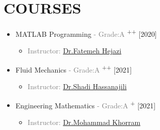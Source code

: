 \documentclass[10pt,a4paper,sans]{moderncv} %
\begin{document}
  
  
	



         
    \section{COURSES}
	\vspace{-1.1 em} 
	
	\begin{multicols}{2}
		\begin{itemize}
			\item {} MATLAB Programming \textcolor{gray}{- Grade:A }\textsuperscript{++} \hfill[2020]
			\begin{itemize}
				\item \textcolor{gray}{Instructor: \href{https://scholar.google.com/citations?hl=en&user=SJs5rMcAAAAJ}{Dr.Fatemeh Hejazi}}


			\end{itemize}
			
			\vspace{0.5 em} 
			\item {} Fluid Mechanics  \textcolor{gray}{- Grade:A }\textsuperscript{++} \hfill[2021]
			\begin{itemize}
				\item \textcolor{gray}{Instructor: \href{https://scholar.google.com/citations?hl=en&user=h1wVb0IAAAAJ&view_op=list_works&sortby=pubdate}{Dr.Shadi Hassanajili
}}
  
			\end{itemize}
			
			\vspace{0.5 em} 

			\item {} Engineering Mathematics \textcolor{gray}{- Grade:A }\textsuperscript{+} \hfill[2021]
			\begin{itemize}
				\item \textcolor{gray}{Instructor: \href{https://scholar.google.com/citations?user=swfaYtQAAAAJ&hl=en}{Dr.Mohammad Khorram}}
				
               \vspace{0.5 em}  
  
			    \end{itemize}
			    

\end{itemize}
\end{multicols}
\end{document}
